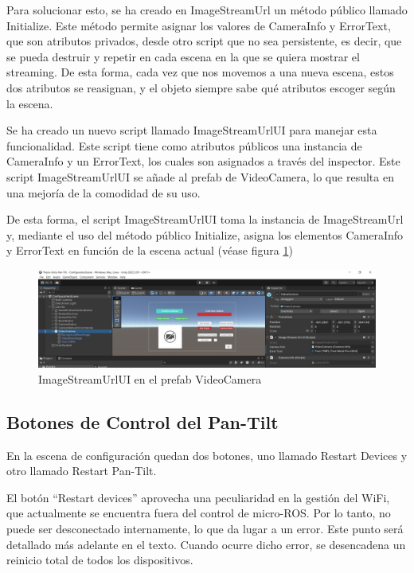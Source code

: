 Para solucionar esto, se ha creado en ImageStreamUrl un método público llamado Initialize. Este método permite asignar los valores de CameraInfo y ErrorText, que son atributos privados, desde otro script que no sea persistente, es decir, que se pueda destruir y repetir en cada escena en la que se quiera mostrar el streaming. De esta forma, cada vez que nos movemos a una nueva escena, estos dos atributos se reasignan, y el objeto siempre sabe qué atributos escoger según la escena.



Se ha creado un nuevo script llamado ImageStreamUrlUI para manejar esta funcionalidad. Este script tiene como atributos públicos una instancia de CameraInfo y un ErrorText, los cuales son asignados a través del inspector. Este script ImageStreamUrlUI se añade al prefab de VideoCamera, lo que resulta en una mejoría de la comodidad de su uso.



De esta forma, el script ImageStreamUrlUI toma la instancia de ImageStreamUrl y, mediante el uso del método público Initialize, asigna los elementos CameraInfo y ErrorText en función de la escena actual (véase figura \ref{figure:imagestreamurlui-videocameraprefab})

\begin{figure}[!htb]
   \centering
    \includegraphics[width=1\linewidth]{figures/imagestreamurlui-videocameraprefab.png}
   \caption{ImageStreamUrlUI en el prefab VideoCamera}
   \label{figure:imagestreamurlui-videocameraprefab}
\end{figure}


\subsection{Botones de Control del Pan-Tilt}
En la escena de configuración quedan dos botones, uno llamado Restart Devices y otro llamado Restart Pan-Tilt.


El botón ``Restart devices'' aprovecha una peculiaridad en la gestión del WiFi, que actualmente se encuentra fuera del control de micro-ROS. Por lo tanto, no puede ser desconectado internamente, lo que da lugar a un error. Este punto será detallado más adelante en el texto. Cuando ocurre dicho error, se desencadena un reinicio total de todos los dispositivos.

